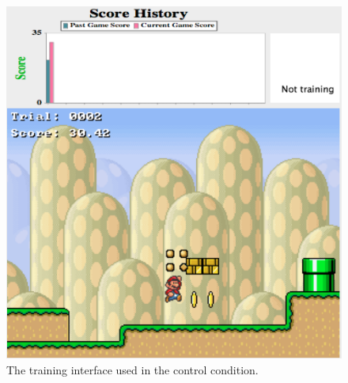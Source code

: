 \documentclass[10pt,journal,compsoc]{IEEEtran}
\begin{document}
\begin{figure}[htb]
\centering
\includegraphics[width=0.75\linewidth]{control} %
\caption{The training interface used in the control condition. }%
\label{control}
\end{figure}

\end{document}
